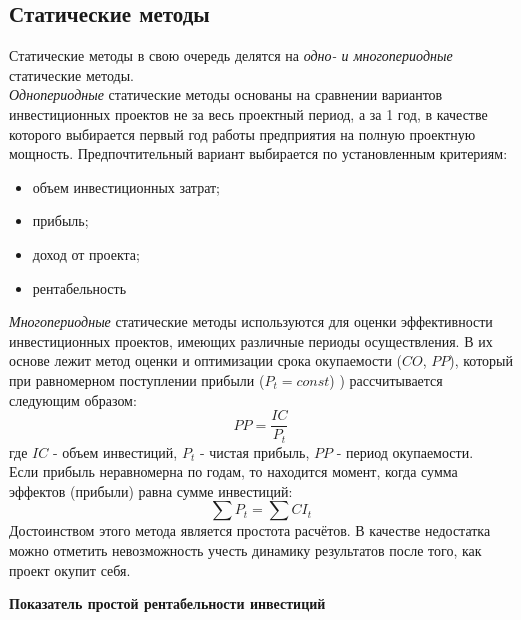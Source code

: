 \documentclass[a4paper,12pt]{article}
\begin{document}
		\subsection{Статические методы}
		Статические методы в свою очередь делятся на \textit{одно- и многопериодные} статические методы.\\
		\textit{Однопериодные} статические методы основаны на сравнении вариантов инвестиционных проектов не за весь проектный период, а за 1
год, в качестве которого выбирается первый год работы предприятия на
полную проектную мощность. Предпочтительный вариант выбирается по
установленным критериям:
\begin{itemize}
\item объем инвестиционных затрат;
\item прибыль;
\item доход от проекта;
\item рентабельность
\end{itemize}
\textit{Многопериодные} статические методы используются для оценки
эффективности инвестиционных проектов, имеющих различные периоды
осуществления. В их основе лежит метод оценки и оптимизации срока
окупаемости (${CO}$, ${PP}$), который при равномерном поступлении прибыли (${P_t}=const$) ) рассчитывается следующим образом:
\begin{equation}
	PP = \frac{IC}{P_t}
\end{equation}
где ${IC}$ - объем инвестиций, ${P_t}$ - чистая прибыль, ${PP}$ - период окупаемости.\\
Если прибыль неравномерна по годам, то находится момент, когда
сумма эффектов (прибыли) равна сумме инвестиций:
\begin{equation}
	\sum P_t = \sum CI_t
\end{equation}
Достоинством этого метода является простота расчётов. В качестве
недостатка можно отметить невозможность учесть динамику результатов
после того, как проект окупит себя.\\
\begin{center}
	\textbf{Показатель простой рентабельности инвестиций}
\end{center}
\end{document}
